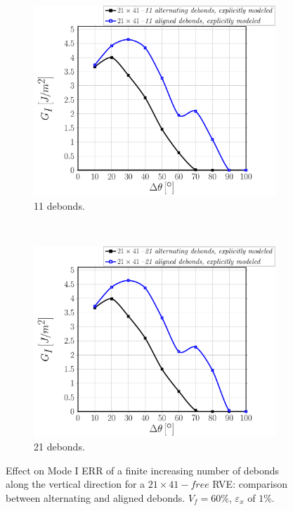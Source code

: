 \documentclass[smallextended]{svjour3}       %
\begin{document}
\begin{figure}[!h]
     \begin{subfigure}[b]{0.475\textwidth}
        \includegraphics[width=\textwidth]{comparison-explicitmodel-11debs-vf60-GI.pdf}
        \caption{11 debonds.}\label{subfig:finitedebscomparisonModeI11debs}
    \end{subfigure} ~
    \begin{subfigure}[b]{0.475\textwidth}
        \includegraphics[width=\textwidth]{comparison-explicitmodel-21debs-vf60-GI.pdf}
        \caption{21 debonds.}\label{subfig:finitedebscomparisonModeI21debs}
    \end{subfigure}

\caption{Effect on Mode I ERR of a finite increasing number of debonds along the vertical direction for a $21\times41-free$ RVE: comparison between alternating and aligned debonds. $V_{f}=60\%$, $\varepsilon_{x}$ of $1\%$.}\label{fig:finitedebscomparisonModeI}
\end{figure}
\end{document}
